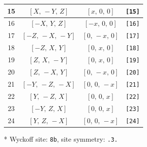\documentclass[fleqn,8pt]{jsarticle}
\begin{document}
\begin{longtable}{cccc}
15 & $\left[ X,\, - Y,\, Z \right]$ & $\left[ x,\, 0,\, 0 \right]$ & {\tt [15]} \\ \hline
16 & $\left[ - X,\, Y,\, Z \right]$ & $\left[ - x,\, 0,\, 0 \right]$ & {\tt [16]} \\ \hline
17 & $\left[ - Z,\, - X,\, - Y \right]$ & $\left[ 0,\, - x,\, 0 \right]$ & {\tt [17]} \\ \hline
18 & $\left[ - Z,\, X,\, Y \right]$ & $\left[ 0,\, x,\, 0 \right]$ & {\tt [18]} \\ \hline
19 & $\left[ Z,\, X,\, - Y \right]$ & $\left[ 0,\, x,\, 0 \right]$ & {\tt [19]} \\ \hline
20 & $\left[ Z,\, - X,\, Y \right]$ & $\left[ 0,\, - x,\, 0 \right]$ & {\tt [20]} \\ \hline
21 & $\left[ - Y,\, - Z,\, - X \right]$ & $\left[ 0,\, 0,\, - x \right]$ & {\tt [21]} \\ \hline
22 & $\left[ Y,\, - Z,\, X \right]$ & $\left[ 0,\, 0,\, x \right]$ & {\tt [22]} \\ \hline
23 & $\left[ - Y,\, Z,\, X \right]$ & $\left[ 0,\, 0,\, x \right]$ & {\tt [23]} \\ \hline
24 & $\left[ Y,\, Z,\, - X \right]$ & $\left[ 0,\, 0,\, - x \right]$ & {\tt [24]} \\
\end{longtable}
* Wyckoff site: {\tt 8b}, site symmetry: {\tt .3.}
\renewcommand{\arraystretch}{1.2}
\end{document}
